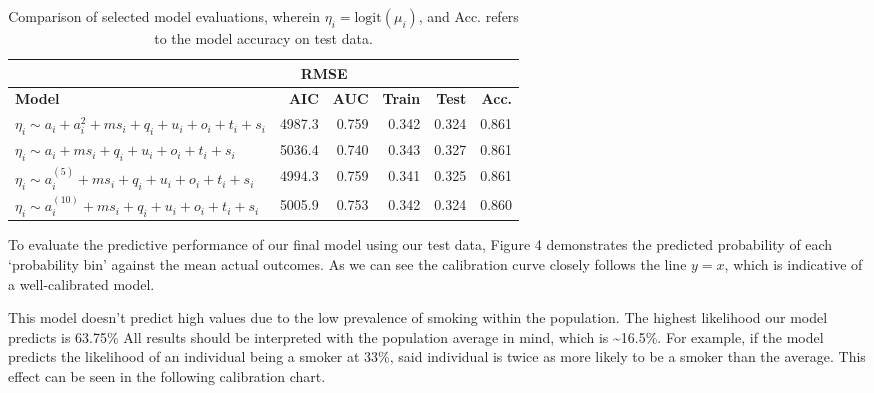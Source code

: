 \documentclass[
  11pt,
  twocolumn]{article}
\begin{document}
\begin{table}
\centering
\caption{\label{tab:outputmodelselectiontable}Comparison of selected model evaluations, wherein $\eta_i = \text{logit}(\mu_i)$, and Acc. refers to the model accuracy on test data.\label{tab:output-model-selection-table}}
\centering
\fontsize{8}{10}\selectfont
\begin{tabular}[t]{>{\raggedright\arraybackslash}p{9em}|r|r|r|r|r}
\hline
\multicolumn{3}{c|}{ } & \multicolumn{2}{c|}{RMSE} & \multicolumn{1}{c}{ } \\
\cline{4-5}
\textbf{Model} & \textbf{AIC} & \textbf{AUC} & \textbf{Train} & \textbf{Test} & \textbf{Acc.}\\
\hline
$\eta_i \sim a_i + a_i^2 + ms_i + q_i + u_i + o_i + t_i + s_i$ & 4987.3 & 0.759 & 0.342 & 0.324 & 0.861\\
\hline
$\eta_i \sim a_i + ms_i + q_i + u_i + o_i + t_i + s_i$ & 5036.4 & 0.740 & 0.343 & 0.327 & 0.861\\
\hline
$\eta_i \sim a_i^{(5)} + ms_i + q_i + u_i + o_i + t_i + s_i$ & 4994.3 & 0.759 & 0.341 & 0.325 & 0.861\\
\hline
$\eta_i \sim a_i^{(10)} + ms_i + q_i + u_i + o_i + t_i + s_i$ & 5005.9 & 0.753 & 0.342 & 0.324 & 0.860\\
\hline
\end{tabular}
\end{table}

To evaluate the predictive performance of our final model using our test
data, Figure 4 demonstrates the predicted probability of each
`probability bin' against the mean actual outcomes. As we can see the
calibration curve closely follows the line \(y = x\), which is
indicative of a well-calibrated model.

This model doesn't predict high values due to the low prevalence of
smoking within the population. The highest likelihood our model predicts
is 63.75\% All results should be interpreted with the population average
in mind, which is \textasciitilde16.5\%. For example, if the model
predicts the likelihood of an individual being a smoker at 33\%, said
individual is twice as more likely to be a smoker than the average. This
effect can be seen in the following calibration chart.
\end{document}
